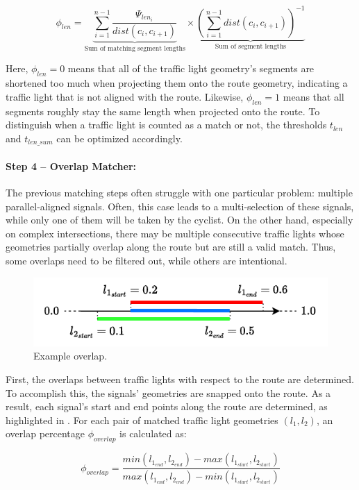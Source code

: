 \begin{equation} 
\phi_{len} = 
    \underbrace{\sum_{i=1}^{n-1} 
    \frac{\Psi_{len_i}}{dist(c_i, c_{i+1})}}_{\text{Sum of matching segment lengths}}
    \times
    \underbrace{(\sum_{i=1}^{n-1} dist(c_i, c_{i+1}))^{-1}}_{\text{Sum of segment lengths}}
\end{equation}

Here, $\phi_{len} = 0$ means that all of the traffic light geometry's segments are shortened too much when projecting them onto the route geometry, indicating a traffic light that is not aligned with the route. Likewise, $\phi_{len} = 1$ means that all segments roughly stay the same length when projected onto the route. To distinguish when a traffic light is counted as a match or not, the thresholds $t_{len}$ and $t_{len\_sum}$ can be optimized accordingly.

\paragraph{Step 4 -- Overlap Matcher:} The previous matching steps often struggle with one particular problem: multiple parallel-aligned signals. Often, this case leads to a multi-selection of these signals, while only one of them will be taken by the cyclist. On the other hand, especially on complex intersections, there may be multiple consecutive traffic lights whose geometries partially overlap along the route but are still a valid match. Thus, some overlaps need to be filtered out, while others are intentional.

\begin{figure}[htbp]
\centering
\includegraphics[width=0.5\linewidth]{images/overlap.drawio.pdf}
\caption{Example overlap.}
\label{fig:sg-matching-overlap-filter}
\end{figure}

First, the overlaps between traffic lights with respect to the route are determined. To accomplish this, the signals' geometries are snapped onto the route. As a result, each signal's start and end points along the route are determined, as highlighted in . For each pair of matched traffic light geometries $(l_1, l_2)$, an overlap percentage $\phi_{overlap}$ is calculated as:

\begin{equation}
    \phi_{overlap} = \frac{min(l_{1_{end}}, l_{2_{end}}) - max(l_{1_{start}}, l_{2_{start}})}{max(l_{1_{end}}, l_{2_{end}}) - min(l_{1_{start}}, l_{2_{start}})}
\end{equation}

